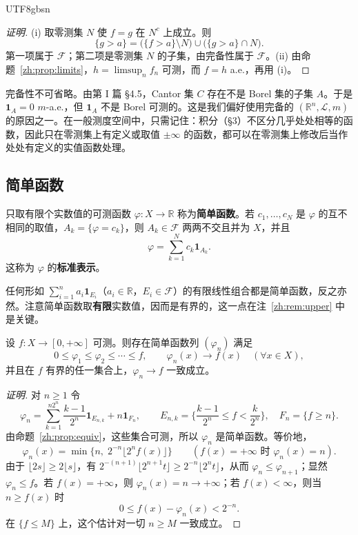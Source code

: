 \documentclass[11pt]{article}
\makeatletter
\newcommand{\envlabel}[1]{\protected@edef\@currentlabel{\themathenv}\label{#1}}
\makeatother
\begin{document}
\begin{CJK*}{UTF8}{gbsn}
\begin{proof}[证明]
(i) 取零测集 $N$ 使 $f=g$ 在 $N^{c}$ 上成立。则
\[
\{g>a\}=\big(\{f>a\}\setminus N\big)\cup\big(\{g>a\}\cap N\big).
\]
第一项属于 $\mathcal{F}$；第二项是零测集 $N$ 的子集，由完备性属于 $\mathcal{F}$。(ii) 由命题~\ref{zh:prop:limits}，$h=\limsup_{n}f_{n}$ 可测，而 $f=h$ a.e.，再用 (i)。
\end{proof}

\begin{remark}
完备性不可省略。由第 I 篇 \S4.5，Cantor 集 $C$ 存在不是 Borel 集的子集 $A$。于是 $\mathbf{1}_{A}=0$ $m$-a.e.，但 $\mathbf{1}_{A}$ 不是 Borel 可测的。这是我们偏好使用完备的 $(\mathbb{R}^{n},\mathcal{L},m)$ 的原因之一。在一般测度空间中，只需记住：积分（\S3）不区分几乎处处相等的函数，因此只在零测集上有定义或取值 $\pm\infty$ 的函数，都可以在零测集上修改后当作处处有定义的实值函数处理。
\end{remark}

\subsection{简单函数}

\begin{definition}[简单函数]
只取有限个实数值的可测函数 $\varphi:X\to\mathbb{R}$ 称为\textbf{简单函数}。若 $c_{1},\ldots,c_{N}$ 是 $\varphi$ 的互不相同的取值，$A_{k}=\{\varphi=c_{k}\}$，则 $A_{k}\in\mathcal{F}$ 两两不交且并为 $X$，并且
\[
\varphi=\sum_{k=1}^{N}c_{k}\mathbf{1}_{A_{k}}.
\]
这称为 $\varphi$ 的\textbf{标准表示}。
\end{definition}

任何形如 $\sum_{i=1}^{n}a_{i}\mathbf{1}_{E_{i}}$（$a_{i}\in\mathbb{R}$，$E_{i}\in\mathcal{F}$）的有限线性组合都是简单函数，反之亦然。注意简单函数取\textbf{有限}实数值，因而是有界的，这一点在注~\ref{zh:rem:upper} 中是关键。

\begin{theorem}[简单函数逼近]\envlabel{zh:thm:simple}
设 $f:X\to[0,+\infty]$ 可测。则存在简单函数列 $(\varphi_{n})$ 满足
\[
0\leq\varphi_{1}\leq\varphi_{2}\leq\cdots\leq f,\qquad \varphi_{n}(x)\to f(x)\quad(\forall x\in X),
\]
并且在 $f$ 有界的任一集合上，$\varphi_{n}\to f$ 一致成立。
\end{theorem}

\begin{proof}[证明]
对 $n\geq1$ 令
\[
\varphi_{n}=\sum_{k=1}^{n2^{n}}\frac{k-1}{2^{n}}\mathbf{1}_{E_{n,k}}+n\mathbf{1}_{F_{n}},\qquad
E_{n,k}=\Big\{\frac{k-1}{2^{n}}\leq f<\frac{k}{2^{n}}\Big\},\quad F_{n}=\{f\geq n\}.
\]
由命题~\ref{zh:prop:equiv}，这些集合可测，所以 $\varphi_{n}$ 是简单函数。等价地，
\[
\varphi_{n}(x)=\min\big\{n,\;2^{-n}\lfloor2^{n}f(x)\rfloor\big\}\qquad(f(x)=+\infty\text{ 时 }\varphi_{n}(x)=n).
\]
由于 $\lfloor2s\rfloor\geq2\lfloor s\rfloor$，有 $2^{-(n+1)}\lfloor2^{n+1}t\rfloor\geq2^{-n}\lfloor2^{n}t\rfloor$，从而 $\varphi_{n}\leq\varphi_{n+1}$；显然 $\varphi_{n}\leq f$。若 $f(x)=+\infty$，则 $\varphi_{n}(x)=n\to+\infty$；若 $f(x)<\infty$，则当 $n\geq f(x)$ 时
\[
0\leq f(x)-\varphi_{n}(x)<2^{-n}.
\]
在 $\{f\leq M\}$ 上，这个估计对一切 $n\geq M$ 一致成立。
\end{proof}


\end{CJK*}
\end{document}
